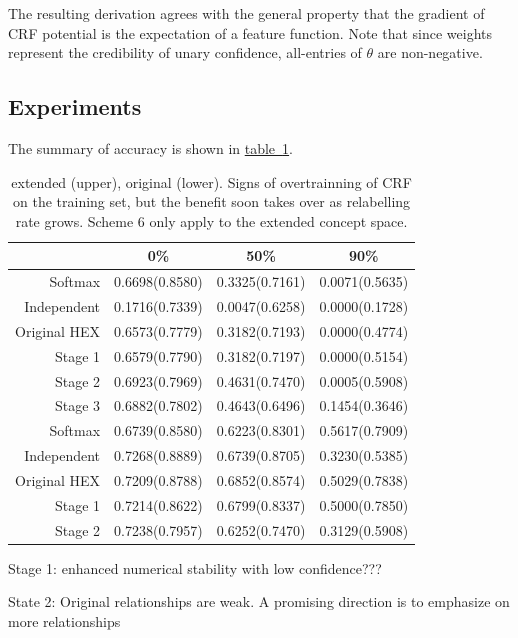\documentclass[11pt,a4paper]{article}
\begin{document}
The resulting derivation agrees with the general property that the gradient of CRF potential is the expectation of a feature function. Note that since weights represent the credibility of unary confidence, all-entries of $\theta$ are non-negative.

\subsection{Experiments}
\label{sec:exp2}

The summary of accuracy is shown in \hyperref[tab:summary]{table~\ref{tab:summary}}.

\begin{table}[htbp]
\centering
\begin{tabular}{r|c|c|c}
 & 0\% & 50\% & 90\%\\
\hline
Softmax & 0.6698(0.8580) & 0.3325(0.7161) & 0.0071(0.5635)\\
Independent & 0.1716(0.7339) & 0.0047(0.6258) & 0.0000(0.1728)\\
Original HEX & 0.6573(0.7779) & 0.3182(0.7193) & 0.0000(0.4774)\\
Stage 1 & 0.6579(0.7790) & 0.3182(0.7197) & 0.0000(0.5154)\\
Stage 2 & 0.6923(0.7969) & 0.4631(0.7470) & 0.0005(0.5908)\\
Stage 3 & 0.6882(0.7802) & 0.4643(0.6496) & 0.1454(0.3646)\\
\hline
Softmax & 0.6739(0.8580) & 0.6223(0.8301) & 0.5617(0.7909)\\
Independent & 0.7268(0.8889) & 0.6739(0.8705) & 0.3230(0.5385)\\
Original HEX & 0.7209(0.8788) & 0.6852(0.8574) & 0.5029(0.7838)\\
Stage 1 & 0.7214(0.8622) & 0.6799(0.8337) & 0.5000(0.7850)\\
Stage 2 & 0.7238(0.7957) & 0.6252(0.7470) & 0.3129(0.5908)
\end{tabular}
\caption{extended (upper), original (lower). Signs of overtrainning of CRF on the training set, but the benefit soon takes over as relabelling rate grows. Scheme 6 only apply to the extended concept space.}
\label{tab:summary}
\end{table}

Stage 1: enhanced numerical stability with low confidence???

State 2: Original relationships are weak. A promising direction is to emphasize on more relationships
\end{document}
